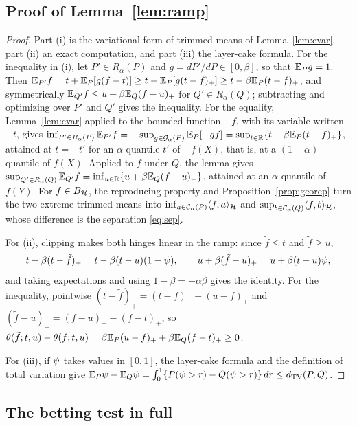 \subsection{Proof of Lemma~\ref{lem:ramp}}

\begin{proof}
Part (i) is the variational form of trimmed means of Lemma~\ref{lem:cvar}, part (ii) an exact computation, and
part (iii) the layer-cake formula. For the inequality in (i), let $P'\in R_\alpha(P)$ and $g=dP'/dP\in[0,\beta]$, so
that $\mathbb{E}_Pg=1$. Then $\mathbb{E}_{P'}f=t+\mathbb{E}_P[g(f-t)]\ge t-\mathbb{E}_P[g(t-f)_+]\ge t-\beta\mathbb{E}_P(t-f)_+$, and symmetrically $\mathbb{E}_{Q'}f\le u+\beta\mathbb{E}_Q(f-u)_+$ for $Q'\in R_\alpha(Q)$; subtracting and optimizing over $P'$ and $Q'$
gives the inequality. For the equality, Lemma~\ref{lem:cvar} applied to the bounded function $-f$, with its variable
written $-t$, gives $\inf_{P'\in R_\alpha(P)}\mathbb{E}_{P'}f=-\sup_{g\in\mathcal G_\alpha(P)}\mathbb{E}_P[-gf]=\sup_{t\in\mathbb{R}}\{t-\beta\mathbb{E}_P(t-f)_+\}$,
attained at $t=-t'$ for an $\alpha$-quantile $t'$ of $-f(X)$, that is, at a $(1-\alpha)$-quantile of $f(X)$. Applied to
$f$ under $Q$, the lemma gives $\sup_{Q'\in R_\alpha(Q)}\mathbb{E}_{Q'}f=\inf_{u\in\mathbb{R}}\{u+\beta\mathbb{E}_Q(f-u)_+\}$, attained at an
$\alpha$-quantile of $f(Y)$. For $f\in B_{\mathcal{H}}$, the reproducing property and Proposition~\ref{prop:georep} turn the two
extreme trimmed means into $\inf_{a\in\mathcal C_\alpha(P)}\langle f,a\rangle_{\mathcal{H}}$ and
$\sup_{b\in\mathcal C_\alpha(Q)}\langle f,b\rangle_{\mathcal{H}}$, whose difference is the separation \eqref{eq:sep}.

For (ii), clipping makes both hinges linear in the ramp: since $\tilde f\le t$ and $\tilde f\ge u$,
\[
t-\beta(t-\tilde f)_+=t-\beta(t-u)(1-\psi),
\qquad
u+\beta(\tilde f-u)_+=u+\beta(t-u)\psi ,
\]
and taking expectations and using $1-\beta=-\alpha\beta$ gives the identity. For the inequality, pointwise
$(t-\tilde f)_+=(t-f)_+-(u-f)_+$ and $(\tilde f-u)_+=(f-u)_+-(f-t)_+$, so
$\theta(\tilde f;t,u)-\theta(f;t,u)=\beta\mathbb{E}_P(u-f)_++\beta\mathbb{E}_Q(f-t)_+\ge0$.

For (iii), if $\psi$ takes values in $[0,1]$, the layer-cake formula and the definition of total variation give
$\mathbb{E}_P\psi-\mathbb{E}_Q\psi=\int_0^1\{P(\psi>r)-Q(\psi>r)\}\,dr\le d_{\mathrm{TV}}(P,Q)$.
\end{proof}

\subsection{The betting test in full}
\label{sec:bettingdetails}


